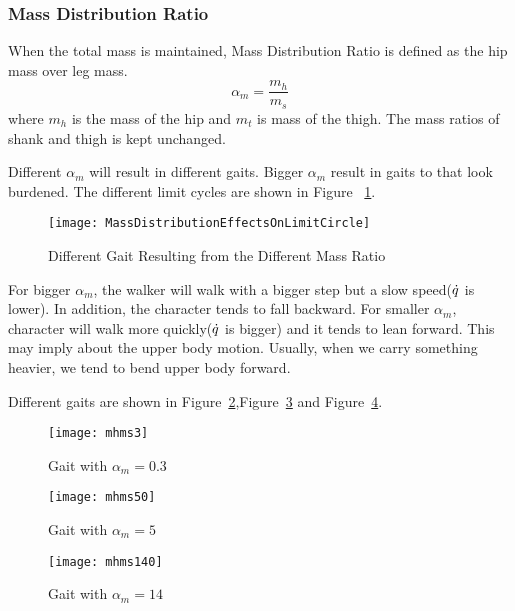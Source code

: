 \subsubsection*{Mass Distribution Ratio}
When the total mass is maintained,
Mass Distribution Ratio is defined as the hip mass over leg mass. 
\[
\alpha_m=\frac{m_h}{m_s}
\]
where $m_h$ is the mass of the hip and $m_t$ is mass of the thigh.
The mass ratios of shank and thigh is kept unchanged.

Different $\alpha_m$ will result in different gaits.
Bigger $\alpha_m$ result in gaits to that  look burdened.
The different limit cycles are shown in Figure ~\ref{fig:differentmh}.
\begin{figure}[!htbp]
  \begin{center}
     \texttt{[image: MassDistributionEffectsOnLimitCircle]}
    \caption{Different Gait Resulting from the Different Mass Ratio}
    \label{fig:differentmh}
\end{center}
\end{figure}

For bigger $\alpha_m$, the walker will walk with a  bigger step but a slow speed($\dot{q}$ is lower).
In addition, the character tends to fall backward.
For smaller $\alpha_m$, character will walk more quickly($\dot{q}$ is bigger) and it tends to lean forward.
This may imply about the upper body motion.
Usually, when we carry something heavier, we tend to bend upper body forward.

Different gaits are shown in Figure~\ref{fig:massh1},Figure~\ref{fig:massh2} and Figure~\ref{fig:massh3}.
\begin{figure}[!htbp]
  \begin{center}
      \texttt{[image: mhms3]}
    \caption{Gait with $\alpha_m=0.3$}
    \label{fig:massh1}
\end{center}
\end{figure}

\begin{figure}[!htbp]
  \begin{center}
      \texttt{[image: mhms50]}
    \caption{Gait with $\alpha_m=5$}
    \label{fig:massh2}
\end{center}
\end{figure}

\begin{figure}[!htbp]
  \begin{center}
      \texttt{[image: mhms140]}
    \caption{Gait with $\alpha_m=14$}
    \label{fig:massh3}
\end{center}
\end{figure}



